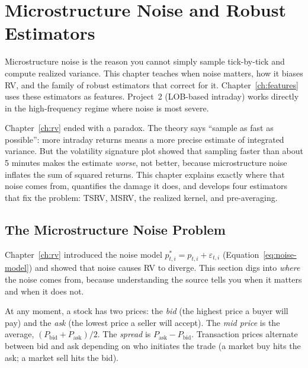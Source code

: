\chapter{Microstructure Noise and Robust Estimators}
\label{ch:noise}

\begin{application}
Microstructure noise is the reason you cannot simply sample tick-by-tick and compute realized variance.
This chapter teaches when noise matters, how it biases RV, and the family of robust estimators that correct for it.
Chapter~\ref{ch:features} uses these estimators as features.
Project~2 (LOB-based intraday) works directly in the high-frequency regime where noise is most severe.
\end{application}

Chapter~\ref{ch:rv} ended with a paradox.
The theory says ``sample as fast as possible'': more intraday returns means a more precise estimate of integrated variance.
But the volatility signature plot showed that sampling faster than about 5 minutes makes the estimate \emph{worse}, not better, because microstructure noise inflates the sum of squared returns.
This chapter explains exactly where that noise comes from, quantifies the damage it does, and develops four estimators that fix the problem: TSRV, MSRV, the realized kernel, and pre-averaging.

\section{The Microstructure Noise Problem}
\label{sec:noise-problem}

Chapter~\ref{ch:rv} introduced the noise model $p^*_{t,i} = p_{t,i} + \varepsilon_{t,i}$ (Equation~\ref{eq:noise-model}) and showed that noise causes RV to diverge.
This section digs into \emph{where} the noise comes from, because understanding the source tells you when it matters and when it does not.

\begin{prereq}
At any moment, a stock has two prices: the \emph{bid} (the highest price a buyer will pay) and the \emph{ask} (the lowest price a seller will accept).
The \emph{mid price} is the average, $(P_{\text{bid}} + P_{\text{ask}})/2$.
The \emph{spread} is $P_{\text{ask}} - P_{\text{bid}}$.
Transaction prices alternate between bid and ask depending on who initiates the trade (a market buy hits the ask; a market sell hits the bid).
\end{prereq}

